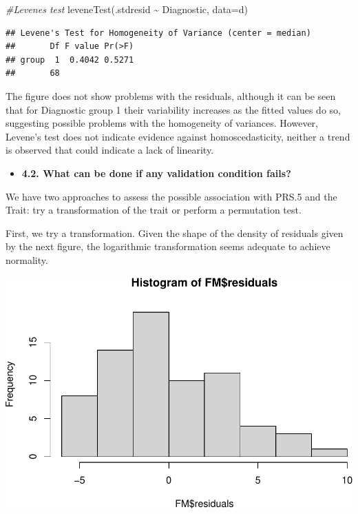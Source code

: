 \documentclass[
]{article}
\newenvironment{Shaded}{\begin{snugshade}}{\end{snugshade}}
\newcommand{\AttributeTok}[1]{\textcolor[rgb]{0.77,0.63,0.00}{#1}}
\newcommand{\CommentTok}[1]{\textcolor[rgb]{0.56,0.35,0.01}{\textit{#1}}}
\newcommand{\FunctionTok}[1]{\textcolor[rgb]{0.00,0.00,0.00}{#1}}
\newcommand{\NormalTok}[1]{#1}
\newcommand{\SpecialCharTok}[1]{\textcolor[rgb]{0.00,0.00,0.00}{#1}}
\providecommand{\tightlist}{%
  \setlength{\itemsep}{0pt}\setlength{\parskip}{0pt}}
\begin{document}
\begin{Shaded}
\begin{Highlighting}[]
\CommentTok{\#Levene\textquotesingle{}s test}
\FunctionTok{leveneTest}\NormalTok{(.stdresid }\SpecialCharTok{\textasciitilde{}}\NormalTok{ Diagnostic, }\AttributeTok{data=}\NormalTok{d)}
\end{Highlighting}
\end{Shaded}

\begin{verbatim}
## Levene's Test for Homogeneity of Variance (center = median)
##       Df F value Pr(>F)
## group  1  0.4042 0.5271
##       68
\end{verbatim}

The figure does not show problems with the residuals, although it can be
seen that for Diagnostic group 1 their variability increases as the
fitted values do so, suggesting possible problems with the homogeneity
of variances. However, Levene's test does not indicate evidence against
homoscedasticity, neither a trend is observed that could indicate a lack
of linearity.

\begin{itemize}
\tightlist
\item
  \textbf{4.2. What can be done if any validation condition fails?}
\end{itemize}

We have two approaches to assess the possible association with PRS.5 and
the Trait: try a transformation of the trait or perform a permutation
test.

First, we try a transformation. Given the shape of the density of
residuals given by the next figure, the logarithmic transformation seems
adequate to achieve normality.

\begin{Shaded}
\end{Shaded}

\includegraphics{WorkingExample2_code_files/figure-latex/unnamed-chunk-11-1.pdf}
\end{document}

